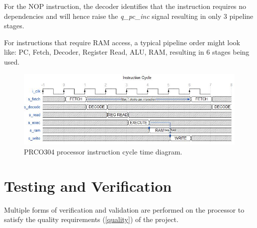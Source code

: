 \documentclass[11pt,a4paper]{report}
\newcommand{\scname}{PRCO304}
\begin{document}
For the NOP instruction, the decoder identifies that the instruction requires no dependencies and will hence raise the \textit{q\_pc\_inc} signal resulting in only 3 pipeline stages.

For instructions that require RAM access, a typical pipeline order might look like: PC, Fetch, Decoder, Register Read, ALU, RAM, resulting in 6 stages being used.

\begin{figure}[H]
\begin{center}
\includegraphics[scale=0.8]{td_instr}
\end{center}
\caption{\scname{} processor instruction cycle time diagram.}
\label{fig:dft_algorithm}
\end{figure}

\section{Testing and Verification}
\label{sect:core_test}
Multiple forms of verification and validation are performed on the processor to satisfy the quality requirements (\ref{quality}) of the project.
\end{document}
